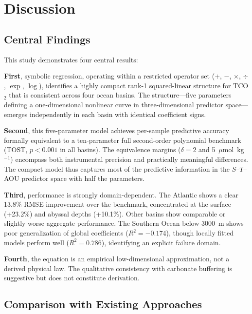 \documentclass[12pt,a4paper]{article}
\begin{document}
\section{Discussion}
\label{sec:discussion}

\subsection{Central Findings}

This study demonstrates four central results:

\textbf{First}, symbolic regression, operating within a restricted operator set ($+$, $-$, $\times$, $\div$, $\exp$, $\log$), identifies a highly compact rank-1 squared-linear structure for TCO$_2$ that is consistent across four ocean basins. The structure---five parameters defining a one-dimensional nonlinear curve in three-dimensional predictor space---emerges independently in each basin with identical coefficient signs.

\textbf{Second}, this five-parameter model achieves per-sample predictive accuracy formally equivalent to a ten-parameter full second-order polynomial benchmark (TOST, $p < 0.001$ in all basins). The equivalence margins ($\delta = 2$ and 5~$\mu$mol~kg$^{-1}$) encompass both instrumental precision and practically meaningful differences. The compact model thus captures most of the predictive information in the $S$--$T$--AOU predictor space with half the parameters.

\textbf{Third}, performance is strongly domain-dependent. The Atlantic shows a clear 13.8\% RMSE improvement over the benchmark, concentrated at the surface (+23.2\%) and abyssal depths (+10.1\%). Other basins show comparable or slightly worse aggregate performance. The Southern Ocean below 3000~m shows poor generalization of global coefficients ($R^2 = -0.174$), though locally fitted models perform well ($R^2 = 0.786$), identifying an explicit failure domain.

\textbf{Fourth}, the equation is an empirical low-dimensional approximation, not a derived physical law. The qualitative consistency with carbonate buffering is suggestive but does not constitute derivation.

\subsection{Comparison with Existing Approaches}
\end{document}
